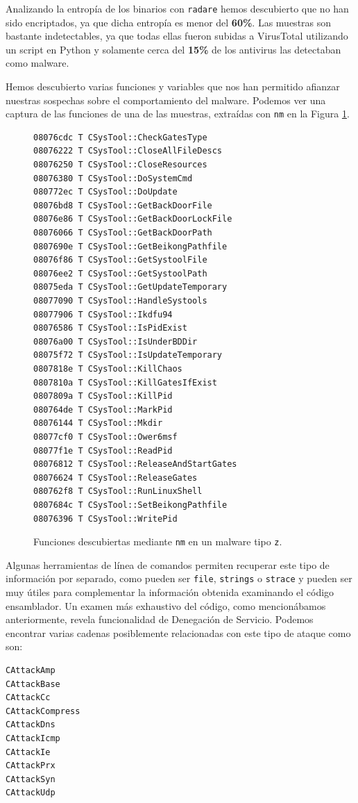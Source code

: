 \documentclass[journal]{IEEEtran}
\begin{document}
Analizando la entropía de los binarios con {\tt radare} hemos descubierto que no han sido encriptados, ya que dicha entropía es menor del \textbf{60\%}. Las muestras son bastante indetectables, ya que todas ellas fueron subidas a VirusTotal utilizando un script en Python y solamente cerca del \textbf{15\%} de los antivirus las detectaban como malware.

Hemos descubierto varias funciones y variables que nos han permitido afianzar nuestras sospechas sobre el comportamiento del malware. Podemos ver una captura de las funciones de una de las muestras, extraídas con {\tt nm} en la Figura \ref{fig:nm}.

\begin{figure}
\begin{lstlisting}[basicstyle=\small\ttfamily]
08076cdc T CSysTool::CheckGatesType
08076222 T CSysTool::CloseAllFileDescs
08076250 T CSysTool::CloseResources
08076380 T CSysTool::DoSystemCmd
080772ec T CSysTool::DoUpdate
08076bd8 T CSysTool::GetBackDoorFile
08076e86 T CSysTool::GetBackDoorLockFile
08076066 T CSysTool::GetBackDoorPath
0807690e T CSysTool::GetBeikongPathfile
08076f86 T CSysTool::GetSystoolFile
08076ee2 T CSysTool::GetSystoolPath
08075eda T CSysTool::GetUpdateTemporary
08077090 T CSysTool::HandleSystools
08077906 T CSysTool::Ikdfu94
08076586 T CSysTool::IsPidExist
08076a00 T CSysTool::IsUnderBDDir
08075f72 T CSysTool::IsUpdateTemporary
0807818e T CSysTool::KillChaos
0807810a T CSysTool::KillGatesIfExist
0807809a T CSysTool::KillPid
080764de T CSysTool::MarkPid
08076144 T CSysTool::Mkdir
08077cf0 T CSysTool::Ower6msf
08077f1e T CSysTool::ReadPid
08076812 T CSysTool::ReleaseAndStartGates
08076624 T CSysTool::ReleaseGates
080762f8 T CSysTool::RunLinuxShell
0807684c T CSysTool::SetBeikongPathfile
08076396 T CSysTool::WritePid
\end{lstlisting}
\caption{Funciones descubiertas mediante {\tt nm} en un malware tipo {\tt z}.}
\label{fig:nm}
\end{figure}

Algunas herramientas de línea de comandos permiten recuperar este tipo de información por separado, como pueden ser {\tt file}, {\tt strings} o {\tt strace} y pueden ser muy útiles para complementar la información obtenida examinando el código ensamblador. Un examen más exhaustivo del código, como mencionábamos anteriormente, revela funcionalidad de Denegación de Servicio. Podemos encontrar varias cadenas posiblemente relacionadas con este tipo de ataque como son:

\begin{lstlisting}[basicstyle=\small\ttfamily]
CAttackAmp
CAttackBase
CAttackCc
CAttackCompress
CAttackDns
CAttackIcmp
CAttackIe
CAttackPrx
CAttackSyn
CAttackUdp
\end{lstlisting}
\end{document}
